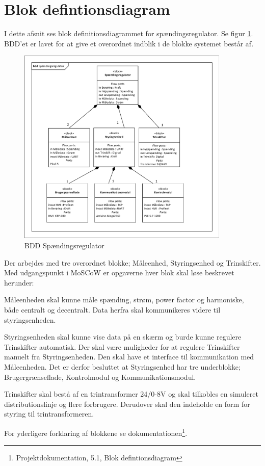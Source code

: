 
\section{Blok defintionsdiagram}

I dette afsnit ses blok definitionsdiagrammet for spændingsregulator. Se figur \ref{fig:BDDSpaendingsregulator}. BDD'et er lavet for at give et overordnet indblik i de blokke systemet består af.

\begin{figure}[htbp] %
	\centering
	\includegraphics[width=0.9\textwidth]{Figure/BDDSpaendingsregulator}
	\caption{BDD Spændingsregulator}
	\label{fig:BDDSpaendingsregulator}
\end{figure}

Der arbejdes med tre overordnet blokke; Måleenhed, Styringsenhed og Trinskifter. Med udgangspunkt i MoSCoW er opgaverne hver blok skal løse beskrevet herunder:


Måleenheden skal kunne måle spænding, strøm, power factor og harmoniske, både centralt og decentralt. Data herfra skal kommunikeres videre til styringsenheden. 


Styringsenheden skal kunne vise data på en skærm og burde kunne regulere Trinskifter automatisk. Der skal være muligheder for at regulere Trinskifter manuelt fra Styringsenheden. Den skal have et interface til kommunikation med Måleenheden. Det er derfor besluttet at Styringsenhed har tre underblokke; Brugergrænseflade, Kontrolmodul og Kommunikationsmodul.


Trinskifter skal bestå af en trintransformer 24/0-8V og skal tilkobles en simuleret distributionslinje og flere forbrugere. Derudover skal den indeholde en form for styring til trintransformeren.


For yderligere forklaring af blokkene se dokumentationen\footnote{Projektdokumentation, 5.1, Blok defintionsdiagram}.